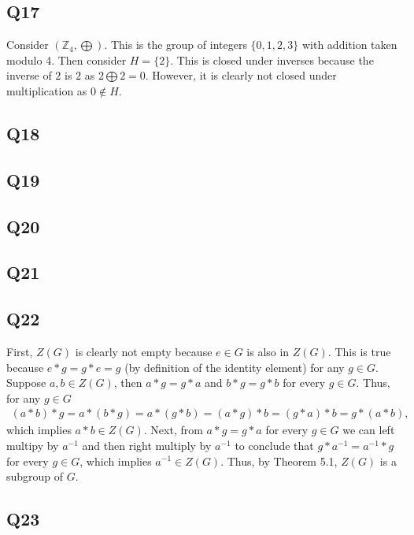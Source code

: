 \documentclass[12pt]{article}
\def\Z{{\mathbb Z}}        %
\numberwithin{theorem}{section}
\numberwithin{equation}{section}
\numberwithin{remark}{section}
\numberwithin{definition}{section}
\numberwithin{theorem}{section}
\numberwithin{lemma}{section}
\numberwithin{example}{section}
\begin{document}
\subsection{Q17}

Consider $(\Z_{4},\bigoplus)$. This is the group of integers $\{0,1,2,3\}$ with addition taken modulo 4. Then consider $H=\{2\}$. This is closed under inverses because the inverse of $2$ is $2$ as $2\bigoplus2=0$. However, it is clearly not closed under multiplication as $0\notin H$. 



\subsection{Q18}

\subsection{Q19}

\subsection{Q20}

\subsection{Q21}

\subsection{Q22}

First, $Z(G)$ is clearly not empty because $e\in G$ is also in $Z(G)$. This is true because $e*g=g*e=g$ (by definition of the identity element) for any $g\in G$. Suppose $a,b\in Z(G)$, then $a*g=g*a$ and $b*g=g*b$ for every $g\in G$. Thus, for any $g\in G$
\begin{align*}
	(a*b)*g  = a*(b*g) = a*(g*b) = (a*g)*b = (g*a)*b = g*(a*b),
\end{align*}
which implies $a*b\in Z(G)$. Next, from $a*g=g*a$ for every $g\in G$ we can left multipy by $a^{-1}$ and then right multiply by $a^{-1}$ to conclude that $g*a^{-1}=a^{-1}*g$ for every $g\in G$, which implies $a^{-1}\in Z(G)$. Thus, by Theorem 5.1, $Z(G)$ is a subgroup of $G$.



\subsection{Q23}
\end{document}
